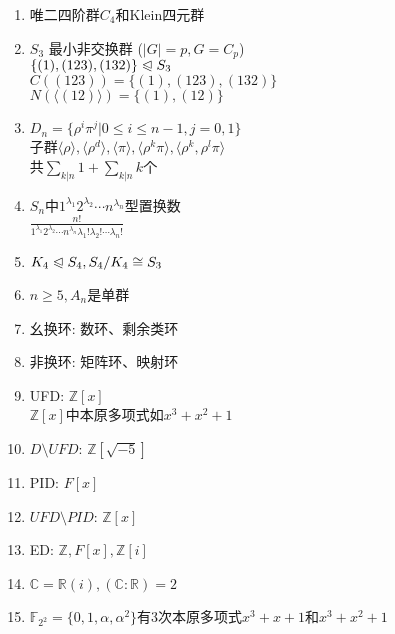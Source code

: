 \documentclass[b4paper, 10pt]{ctexart}
\newcommand*{\bb}[1]{\mathbb{#1}}
\newcommand*{\setZ}{\mathbb{Z}}
\newcommand*{\setR}{\mathbb{R}}
\newcommand*{\setC}{\mathbb{C}}
\renewcommand*{\leq}{\leqslant}
\renewcommand*{\geq}{\geqslant}
\newcommand*{\nmsubgroupeq}{\trianglelefteqslant}
\newcommand*{\gengroup}[1]{\langle #1 \rangle}
\newcommand*{\ff}[1]{\bb{F}_{#1}}
\begin{document}
\begin{multicols}{3}
    \begin{enumerate}
        \item 唯二四阶群$C_4$和Klein四元群
        \item $S_3$ 最小非交换群 ($|G| = p, G = C_p$)\\
              $\{(1), (123), (132)\} \nmsubgroupeq S_3$ \\
              $C((123)) = \{ (1), (123), (132) \}$ \\
              $N(\gengroup{(12)}) = \{ (1), (12) \}$
        \item $D_n = \{\rho^i \pi^j | 0 \leq i \leq n - 1, j = 0, 1 \}$ \\
              子群$\gengroup{\rho}, \gengroup{\rho^d}, \gengroup{\pi}, \gengroup{\rho^k \pi}, \gengroup{\rho^k, \rho^l\pi}$ \\
              共$\sum_{k|n} 1 + \sum_{k|n} k$个
        \item $S_n$中$1^{\lambda_1} 2^{\lambda_2}\cdots n^{\lambda_n}$型置换数\\
              $\frac{n!}{1^{\lambda_1} 2^{\lambda_2}\cdots n^{\lambda_n} \lambda_1! \lambda_2! \cdots \lambda_n!}$
        \item $K_4 \nmsubgroupeq S_4, S_4/K_4 \cong S_3$
        \item $n \geq 5, A_n$是单群
        \item 幺换环: 数环、剩余类环
        \item 非换环: 矩阵环、映射环
        \item UFD: $\setZ[x]$\\
              $\setZ[x]$中本原多项式如$x^3 + x^2 + 1$
        \item $D \!\setminus\! UFD$: $\setZ[\sqrt{-5}]$
        \item PID: $F[x]$
        \item $UFD \!\setminus\! PID$: $\setZ[x]$
        \item ED: $\setZ, F[x], \setZ[i]$
        \item $\setC = \setR(i), (\setC : \setR) = 2$
        \item $\ff{2^2} \! = \! \{ 0, 1, \alpha, \alpha^2 \}$有3次本原多项式$x^3 + x + 1$和$x^3 + x^2 + 1$
    \end{enumerate}

\end{multicols}
\end{document}
